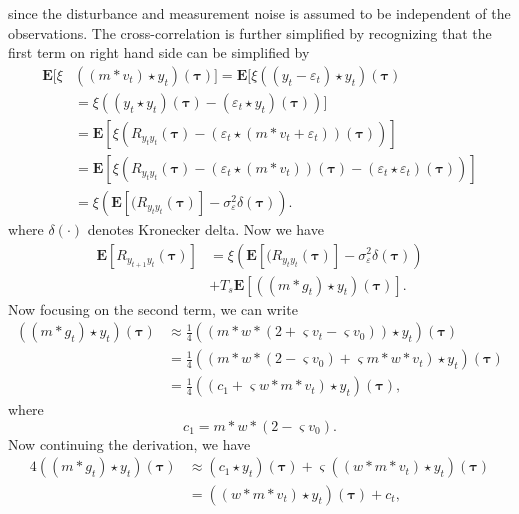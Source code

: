 \documentclass[conference]{IEEEtran}
\begin{document}
since the disturbance and measurement noise is assumed to be independent of the observations. 
The cross-correlation is further simplified by recognizing that the first term on right hand side can be simplified by
\begin{align}
	\mathbf{E}[\xi&\left(\left(m \ast v_t \right) \star y_t \right)(\boldsymbol{\tau})] = \mathbf{E}[\xi\left(\left(y_t-\varepsilon_t\right) \star y_t \right)(\boldsymbol{\tau}) \\
	&= \xi ((y_t \star y_t)(\boldsymbol{\tau}) - \left(\varepsilon_t\star y_t \right)(\boldsymbol{\tau}))] \\
	&= \mathbf{E}[\xi (R_{y_ty_t}(\boldsymbol{\tau})  - \left(\varepsilon_t \star (m\ast v_t + \varepsilon_t)\right) (\boldsymbol{\tau}))] \\
	&=\mathbf{E}[\xi (R_{y_ty_t}(\boldsymbol{\tau})  -\left(\varepsilon_t\star (m\ast v_t)\right)(\boldsymbol{\tau}) - (\varepsilon_t\star\varepsilon_t)(\boldsymbol{\tau}))] \\
	&= \xi\left(\mathbf{E}[ (R_{y_ty_t}(\boldsymbol{\tau})] - \sigma_{\varepsilon}^2 \delta(\boldsymbol{\tau})\right).
\end{align}
where $\delta\left(\cdot\right)$ denotes Kronecker delta. Now we have
\begin{align}
	\mathbf{E}[R_{y_{t+1}y_t}(\boldsymbol{\tau})] &= \xi\left(\mathbf{E}[ (R_{y_ty_t}(\boldsymbol{\tau})] - \sigma_{\varepsilon}^2 \delta(\boldsymbol{\tau})\right) \nonumber \\
	&+ T_s\mathbf{E}[ \left(\left(m\ast g_t\right)\star y_t \right)(\boldsymbol{\tau})].
\end{align}
Now focusing on the second term, we can write
\begin{align}
	((m \ast g_t) \star y_t)(\boldsymbol\tau) &\approx \frac{1}{4}((m \ast w \ast (2 + \varsigma v_t - \varsigma v_0))\star y_t)(\boldsymbol\tau) \\
	&= \frac{1}{4}((m\ast w \ast (2 -\varsigma v_0) + \varsigma m\ast w\ast v_t) \star y_t)(\boldsymbol\tau) \\
&= \frac{1}{4}((c_1 + \varsigma w \ast m\ast v_t) \star y_t)(\boldsymbol\tau),
\end{align}
where
\begin{equation}
	c_1 = m\ast w\ast (2 - \varsigma v_0).
\end{equation}
Now continuing the derivation, we have
\begin{align}
4((m \ast g_t) \star y_t)(\boldsymbol\tau) &\approx (c_1 \star y_t)(\boldsymbol\tau) + \varsigma ((w \ast m\ast v_t) \star y_t)(\boldsymbol\tau) \\
&= (( w \ast m\ast v_t ) \star y_t)(\boldsymbol\tau) + c_t,
\end{align}
\end{document}
